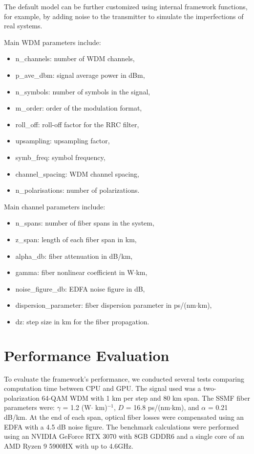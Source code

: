 The default model can be further customized using internal framework functions, for example, by adding noise to the transmitter to simulate the imperfections of real systems.

Main WDM parameters include:
\begin{itemize}
     \item  \textrm{n\_channels}: number of WDM channels,
     \item  \textrm{p\_ave\_dbm}: signal average power in dBm,
     \item  \textrm{n\_symbols}: number of symbols in the signal,
     \item  \textrm{m\_order}: order of the modulation format,
     \item  \textrm{roll\_off}: roll-off factor for the RRC filter,
     \item  \textrm{upsampling}: upsampling factor,
     \item  \textrm{symb\_freq}: symbol frequency,
     \item  \textrm{channel\_spacing}: WDM channel spacing,
     \item  \textrm{n\_polarisations}: number of polarizations.
\end{itemize}

Main channel parameters include:
\begin{itemize}
     \item  \textrm{n\_spans}: number of fiber spans in the system,
     \item  \textrm{z\_span}: length of each fiber span in km,
     \item  \textrm{alpha\_db}: fiber attenuation in dB/km,
     \item  \textrm{gamma}: fiber nonlinear coefficient in W$\cdot$km,
     \item  \textrm{noise\_figure\_db}: EDFA noise figure in dB,
     \item  \textrm{dispersion\_parameter}: fiber dispersion parameter in ps/(nm$\cdot$km),
     \item  \textrm{dz}: step size in km for the fiber propagation.
\end{itemize}

\section{Performance Evaluation}
To evaluate the framework's performance, we conducted several tests comparing computation time between CPU and GPU. The signal used was a two-polarization 64-QAM WDM with 1 km per step and 80 km span. The SSMF fiber parameters were: $\gamma$ = 1.2 (W$\cdot$ km)$^{-1}$, $D$ = 16.8 ps/(nm$\cdot$km), and $\alpha$ = 0.21 dB/km. At the end of each span, optical fiber losses were compensated using an EDFA with a 4.5 dB noise figure. The benchmark calculations were performed using an NVIDIA GeForce RTX 3070 with 8GB GDDR6 and a single core of an AMD Ryzen 9 5900HX with up to 4.6GHz.

